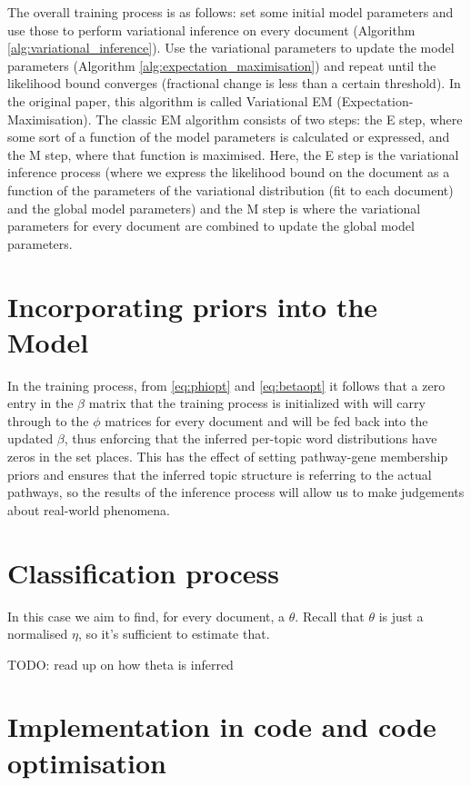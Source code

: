 \documentclass[12pt,a4paper,twoside,openright]{report}
\begin{document}
The overall training process is as follows: set some initial model parameters and use those to perform variational inference on every document (Algorithm \ref{alg:variational_inference}). Use the variational parameters to update the model parameters (Algorithm \ref{alg:expectation_maximisation}) and repeat until the likelihood bound converges (fractional change is less than a certain threshold). In the original paper, this algorithm is called Variational EM (Expectation-Maximisation). The classic EM algorithm consists of two steps: the E step, where some sort of a function of the model parameters is calculated or expressed, and the M step, where that function is maximised. Here, the E step is the variational inference process (where we express the likelihood bound on the document as a function of the parameters of the variational distribution (fit to each document) and the global model parameters) and the M step is where the variational parameters for every document are combined to update the global model parameters.



\section{Incorporating priors into the Model}

In the training process, from \eqref{eq:phiopt} and \eqref{eq:betaopt} it follows that a zero entry in the $\beta$ matrix that the training process is initialized with will carry through to the $\phi$ matrices for every document and will be fed back into the updated $\beta$, thus enforcing that the inferred per-topic word distributions have zeros in the set places. This has the effect of setting pathway-gene membership priors and ensures that the inferred topic structure is referring to the actual pathways, so the results of the inference process will allow us to make judgements about real-world phenomena.

\section{Classification process}

In this case we aim to find, for every document, a $\theta$. Recall that $\theta$ is just a normalised $\eta$, so it's sufficient to estimate that.

TODO: read up on how theta is inferred

\section{Implementation in code and code optimisation}
\end{document}
